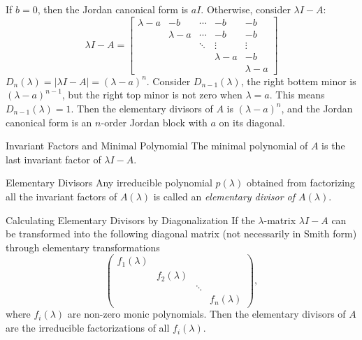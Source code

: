 \begin{solution}
  If $b = 0$, then the Jordan canonical form is $a I$.
  Otherwise, consider $\lambda I - A$:
  \begin{equation}
    \lambda I-A=\begin{bmatrix}\lambda-a&-b&\cdots&-b&-b\\&\lambda-a&\cdots&-b&-b\\&&\ddots&\vdots&\vdots\\&&&\lambda-a&-b\\&&&&\lambda-a\end{bmatrix}
  \end{equation}
  $D_n(\lambda) = |\lambda I - A| = (\lambda - a)^n$.
  Consider $D_{n-1}(\lambda)$, the right bottem minor is $(\lambda - a)^{n-1}$,
  but the right top minor is not zero when $\lambda = a$.
  This means $D_{n-1}(\lambda) = 1$.
  Then the elementary divisors of $A$ is $(\lambda - a)^n$,
  and the Jordan canonical form is an $n$-order Jordan block with $a$ on its diagonal.
\end{solution}

\begin{proposition}{Invariant Factors and Minimal Polynomial}{}
  The minimal polynomial of $A$ is the last invariant factor of $\lambda I - A$.
\end{proposition}

\begin{definition}{Elementary Divisors}{}
  Any irreducible polynomial $p(\lambda)$
  obtained from factorizing all the invariant factors of $A(\lambda)$ is called
  an \emph{elementary divisor of $A(\lambda)$}.
\end{definition}

\begin{proposition}{Calculating Elementary Divisors by Diagonalization}{}
  If the $\lambda$-matrix $\lambda I - A$ can be transformed into
  the following diagonal matrix (not necessarily in Smith form) through elementary transformations
  \begin{equation}
    \begin{pmatrix}
      f_1(\lambda) & & &\\
                   &f_2(\lambda) & &\\
                   & &\ddots &\\
                   & & &f_n(\lambda)
    \end{pmatrix},
  \end{equation}
  where $f_i(\lambda)$ are non-zero monic polynomials.
  Then the elementary divisors of $A$ are the irreducible factorizations of all $f_i(\lambda)$.
\end{proposition}

